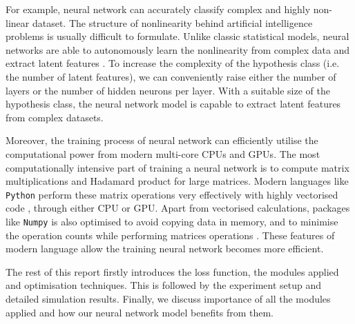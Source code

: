 For example, neural network can accurately classify complex and highly non-linear dataset. The structure of nonlinearity behind artificial intelligence problems is usually difficult to formulate. Unlike classic statistical models, neural networks are able to autonomously learn the nonlinearity from complex data and extract latent features \citep{Bishop:2006:PRM:1162264}. To increase the complexity of the hypothesis class (i.e. the number of latent features), we can conveniently raise either the number of layers or the number of hidden neurons per layer.  
With a suitable size of the  hypothesis class, the neural network model is capable to extract latent features from complex datasets.

Moreover, the training process of neural network can efficiently utilise the computational power from modern multi-core CPUs and GPUs. The most computationally intensive part of training a neural network is to compute matrix multiplications and Hadamard product for large matrices. Modern languages like \texttt{Python} perform these matrix operations very effectively with highly vectorised code \citep{5725236}, through either CPU or GPU. Apart from vectorised calculations, packages like \texttt{Numpy} is also optimised to avoid copying data in memory, and to minimise the operation counts while performing matrices operations \citep{5725236}. These features of modern language allow the training neural network becomes more efficient.

The rest of this report firstly introduces the loss function, the modules applied and optimisation techniques. 
This is followed by the experiment setup and detailed simulation results.
Finally, we discuss importance of all the modules applied and how our neural network model benefits from them.
